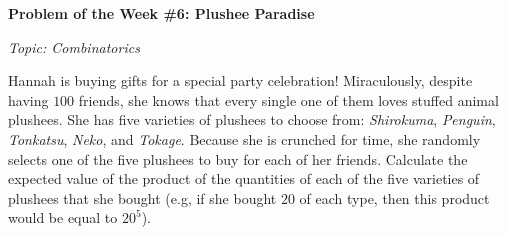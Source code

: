 \begin{potw}\vspace{5pt}
{\large\textbf{Problem of the Week \#6: Plushee Paradise}}\vspace{5pt}

\textit{Topic: Combinatorics}\V

Hannah is buying gifts for a special party celebration! Miraculously, despite having $100$ friends, she knows that every single one of them loves stuffed animal plushees. She has five varieties of plushees to choose from: \textit{Shirokuma}, \textit{Penguin}, \textit{Tonkatsu}, \textit{Neko}, and \textit{Tokage}. Because she is crunched for time, she randomly selects one of the five plushees to buy for each of her friends. Calculate the expected value of the product of the quantities of each of the five varieties of plushees that she bought (e.g, if she bought $20$ of each type, then this product would be equal to $20^5$).
\end{potw}\V
